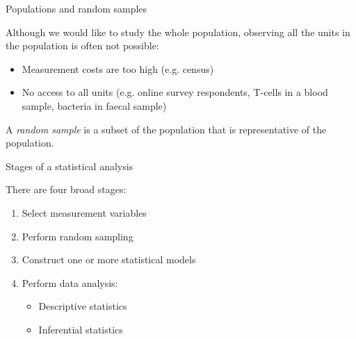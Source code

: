 \documentclass{beamer}
\begin{document}
\begin{frame}{Populations and random samples}

	Although we would like to study the whole population, observing all the
	units in the population is often not possible:
	\begin{itemize}
		\item Measurement costs are too high (e.g. census)
		\item No access to all units (e.g. online survey respondents, T-cells in a
	blood sample, bacteria in faecal sample)
	\end{itemize}
	
	\begin{block}{}
		A \textit{random sample} is a subset of the population that is representative of
		the population.
	\end{block}

\end{frame}

\begin{frame}{Stages of a statistical analysis}

	There are four broad stages:
	\begin{enumerate}
		\item Select measurement variables
		\item Perform random sampling
		\item Construct one or more statistical models
		\item Perform data analysis:
		\begin{itemize} 
			\item Descriptive statistics
			\item Inferential statistics
		\end{itemize}
	\end{enumerate}

\end{frame}
\end{document}
